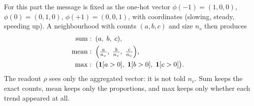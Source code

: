 \documentclass[11pt,letterpaper]{article}
\begin{document}
For this part the message is fixed as the one-hot vector
$\phi(-1) = (1,0,0)$, $\phi(0) = (0,1,0)$, $\phi(+1) = (0,0,1)$, with coordinates
(slowing, steady, speeding up). A neighbourhood with counts $(a, b, c)$ and size $n_v$ then
produces
\begin{align*}
\text{sum}  &:\; (a,\; b,\; c), \\
\text{mean} &:\; \Bigl(\tfrac{a}{n_v},\; \tfrac{b}{n_v},\; \tfrac{c}{n_v}\Bigr), \\
\text{max}  &:\; \bigl(\mathbf{1}[a > 0],\; \mathbf{1}[b > 0],\; \mathbf{1}[c > 0]\bigr).
\end{align*}
The readout $\rho$ sees only the aggregated vector: it is not told $n_v$. Sum keeps the exact
counts, mean keeps only the proportions, and max keeps only whether each trend appeared at
all.
\end{document}
